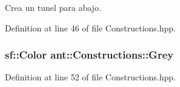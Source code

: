 Crea un tunel para abajo. 



Definition at line 46 of file Constructions.\+hpp.

\hypertarget{classant_1_1_constructions_a7944525a68c021ffe9e7c7afbd2d8f9a}{
\subsubsection[{Grey}]{\setlength{\rightskip}{0pt plus 5cm}sf\+::\+Color ant\+::\+Constructions\+::\+Grey\hspace{0.3cm}{\ttfamily [static]}}}\label{classant_1_1_constructions_a7944525a68c021ffe9e7c7afbd2d8f9a}


Definition at line 52 of file Constructions.\+hpp.

